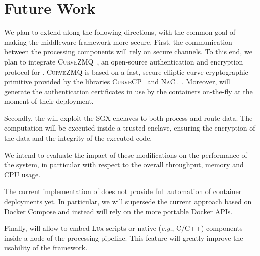 \section{Future Work}\label{sec:future}

We plan to extend \SYS{} along the following directions, with the common goal of making the middleware framework more secure.
First, the communication between the processing components will rely on secure channels.
To this end, we plan to integrate \textsc{CurveZMQ}~\cite{zmq:curvezmq}, an open-source authentication and encryption protocol for \zmq{}.
\textsc{CurveZMQ} is based on a fast, secure elliptic-curve cryptographic primitive provided by the libraries \textsc{CurveCP}~\cite{zmq:curvecp} and \textsc{NaCl}~\cite{zmq:nacl}. 
Moreover, \SYS{} will generate the authentication certificates in use by the containers on-the-fly at the moment of their deployment.

Secondly, the \SYS{} will exploit the SGX enclaves to both process and route data.
The computation will be executed inside a trusted enclave, ensuring the encryption of the data and the integrity of the executed code.

We intend to evaluate the impact of these modifications on the performance of the system, in particular with respect to the overall throughput, memory and CPU usage.

The current implementation of \SYS does not provide full automation of container deployments yet.
In particular, we will supersede the current approach based on Docker Compose and instead will rely on the more portable Docker APIs.

Finally, \SYS{} will allow to embed \textsc{Lua} scripts or native (\emph{e.g.}, C/C++) components inside a node of the processing pipeline. 
This feature will greatly improve the usability of the framework.
